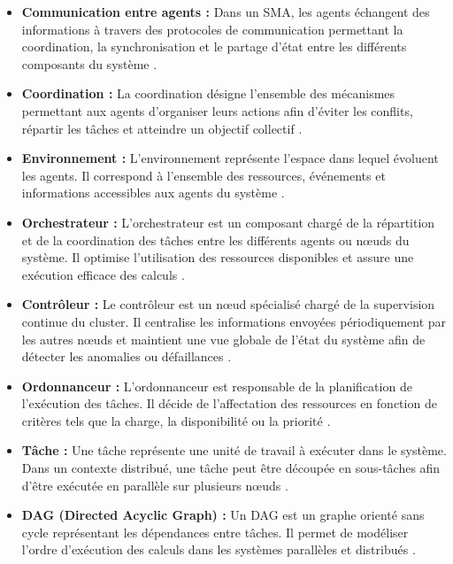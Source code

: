 \documentclass[12pt,a4paper]{report}
\begin{document}
\begin{itemize}
    \item[$\bullet$] \textbf{Communication entre agents :} Dans un SMA, les agents échangent des informations à travers des protocoles de communication permettant la coordination, la synchronisation et le partage d'état entre les différents composants du système \cite{wooldridge}.

    \item[$\bullet$] \textbf{Coordination :} La coordination désigne l'ensemble des mécanismes permettant aux agents d'organiser leurs actions afin d'éviter les conflits, répartir les tâches et atteindre un objectif collectif \cite{wooldridge}.

    \item[$\bullet$] \textbf{Environnement :} L'environnement représente l'espace dans lequel évoluent les agents. Il correspond à l'ensemble des ressources, événements et informations accessibles aux agents du système \cite{wooldridge}.

    \item[$\bullet$] \textbf{Orchestrateur :} L'orchestrateur est un composant chargé de la répartition et de la coordination des tâches entre les différents agents ou nœuds du système. Il optimise l'utilisation des ressources disponibles et assure une exécution efficace des calculs \cite{tanenbaum_ds, kubernetes}.

    \item[$\bullet$] \textbf{Contrôleur :} Le contrôleur est un nœud spécialisé chargé de la supervision continue du cluster. Il centralise les informations envoyées périodiquement par les autres nœuds et maintient une vue globale de l'état du système afin de détecter les anomalies ou défaillances \cite{tanenbaum_ds}.

    \item[$\bullet$] \textbf{Ordonnanceur :} L'ordonnanceur est responsable de la planification de l'exécution des tâches. Il décide de l'affectation des ressources en fonction de critères tels que la charge, la disponibilité ou la priorité \cite{topcuoglu}.

    \item[$\bullet$] \textbf{Tâche :} Une tâche représente une unité de travail à exécuter dans le système. Dans un contexte distribué, une tâche peut être découpée en sous-tâches afin d'être exécutée en parallèle sur plusieurs nœuds \cite{topcuoglu}.

    \item[$\bullet$] \textbf{DAG (Directed Acyclic Graph) :} Un DAG est un graphe orienté sans cycle représentant les dépendances entre tâches. Il permet de modéliser l'ordre d'exécution des calculs dans les systèmes parallèles et distribués \cite{topcuoglu}.


\end{itemize}
\end{document}
